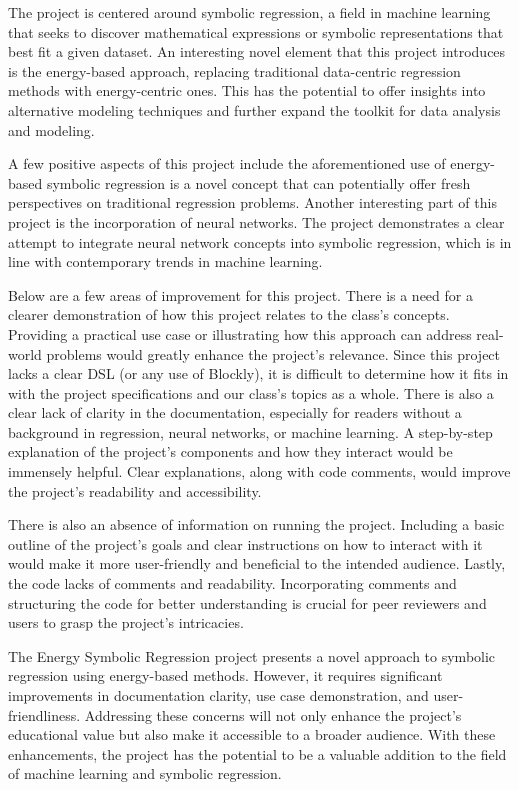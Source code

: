 \documentclass{article}
\theoremstyle{theorem}
\theoremstyle{definition}
\theoremstyle{remark}
\begin{document}
The project is centered around symbolic regression, a field in machine learning that seeks to discover mathematical expressions or symbolic representations that best fit a given dataset. An interesting novel element that this project introduces is the energy-based approach, replacing traditional data-centric regression methods with energy-centric ones. This has the potential to offer insights into alternative modeling techniques and further expand the toolkit for data analysis and modeling.

A few positive aspects of this project include the aforementioned use of energy-based symbolic regression is a novel concept that can potentially offer fresh perspectives on traditional regression problems. Another interesting part of this project is the incorporation of neural networks. The project demonstrates a clear attempt to integrate neural network concepts into symbolic regression, which is in line with contemporary trends in machine learning.

Below are a few areas of improvement for this project. There is a need for a clearer demonstration of how this project relates to the class's concepts. Providing a practical use case or illustrating how this approach can address real-world problems would greatly enhance the project's relevance. Since this project lacks a clear DSL (or any use of Blockly), it is difficult to determine how it fits in with the project specifications and our class's topics as a whole. There is also a clear lack of clarity in the documentation, especially for readers without a background in regression, neural networks, or machine learning. A step-by-step explanation of the project's components and how they interact would be immensely helpful. Clear explanations, along with code comments, would improve the project's readability and accessibility.

There is also an absence of information on running the project. Including a basic outline of the project's goals and clear instructions on how to interact with it would make it more user-friendly and beneficial to the intended audience. Lastly, the code lacks of comments and readability. Incorporating comments and structuring the code for better understanding is crucial for peer reviewers and users to grasp the project's intricacies.

The Energy Symbolic Regression project presents a novel approach to symbolic regression using energy-based methods. However, it requires significant improvements in documentation clarity, use case demonstration, and user-friendliness. Addressing these concerns will not only enhance the project's educational value but also make it accessible to a broader audience. With these enhancements, the project has the potential to be a valuable addition to the field of machine learning and symbolic regression.
\end{document}
